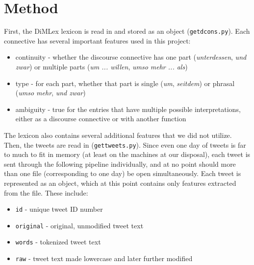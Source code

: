 \documentclass[11pt]{article}
\def\mono#1{\texttt{#1}}  %
\begin{document}
\section{Method}

First, the DiMLex lexicon is read in and stored as an object (\mono{get\textunderscore dcons.py}).  Each connective has several important features used in this project:
\begin{itemize}
\renewcommand\labelitemi{--}
\item continuity - whether the discourse connective has one part (\emph{unterdessen}, \emph{und zwar}) or multiple parts (\emph{um ... willen}, \emph{umso mehr ... als})
\item type - for each part, whether that part is single (\emph{um}, \emph{seitdem}) or phrasal (\emph{umso mehr}, \emph{und zwar})
\item ambiguity - true for the entries that have multiple possible interpretations, either as a discourse connective or with another function
\end{itemize}
 The lexicon also contains several additional features that we did not utilize. \\
 
Then, the tweets are read in (\mono{get\textunderscore tweets.py}).  Since even one day of tweets is far to much to fit in memory (at least on the machines at our disposal), each tweet is sent through the following pipeline individually, and at no point should more than one file (corresponding to one day) be open simultaneously.  Each tweet is represented as an object, which at this point contains only features extracted from the file.  These include:
\begin{itemize}
\renewcommand\labelitemi{--}
\item \mono{id} - unique tweet ID number
\item \mono{\textunderscore original} - original, unmodified tweet text
\item \mono{words} - tokenized tweet text
\item \mono{raw} - tweet text made lowercase and later further modified
\end{itemize}
\end{document}
